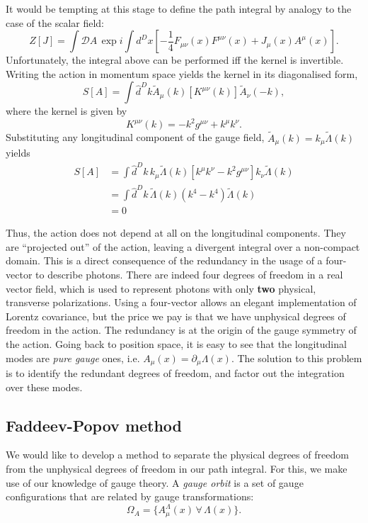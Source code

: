 \documentclass{article}
\numberwithin{equation}{section}
\begin{document}
It would be tempting at this stage to define the path integral by analogy to the case of the scalar field:
\begin{equation}
    Z[J] = \int \mathcal{D}A \, \exp{i \int d^Dx \left[-\frac{1}{4}F_{\mu\nu}(x)F^{\mu\nu}(x) + J_\mu(x) A^\mu(x)\right]}.
\end{equation}
Unfortunately, the integral above can be performed iff the kernel is invertible. Writing the action in momentum space yields the kernel in its diagonalised form,
\begin{equation}
    S[A] = \int \hat{d}^Dk \tilde{A}_\mu(k)[K^{\mu\nu}(k)]\tilde{A}_\nu(-k),
\end{equation}
where the kernel is given by 
\begin{equation}
    K^{\mu\nu}(k) = -k^2 g^{\mu\nu} + k^\mu k^\nu.
\end{equation}
Substituting any longitudinal component of the gauge field, $\tilde{A}_\mu(k) = k_\mu \tilde{\Lambda}(k)$ yields
\begin{equation}
\begin{aligned}
    S[A] &= \int \hat{d}^Dk \,k_\mu \tilde{\Lambda}(k)[k^\mu k^\nu - k^2 g^{\mu\nu}]k_\nu \tilde{\Lambda}(k) \\
    &= \int \hat{d}^Dk \, \tilde{\Lambda}(k) (k^4 - k^4)\tilde{\Lambda}(k) \\
    &= 0
\end{aligned}
\end{equation}

Thus, the action does not depend at all on the longitudinal components. They are ``projected out'' of the action, leaving a divergent integral over a non-compact domain. This is a direct consequence of the redundancy in the usage of a four-vector to describe photons. There are indeed four degrees of freedom in a real vector field, which is used to represent photons with only \textbf{two} physical, transverse polarizations. Using a four-vector allows an elegant implementation of Lorentz covariance, but the price we pay is that we have unphysical degrees of freedom in the action. The redundancy is at the origin of the gauge symmetry of the action. Going back to position space, it is easy to see that the longitudinal modes are \textit{pure gauge} ones, i.e. $A_\mu(x) = \partial_\mu \Lambda(x)$. The solution to this problem is to identify the redundant degrees of freedom, and factor out the integration over these modes.

\subsection{Faddeev-Popov method}
We would like to develop a method to separate the physical degrees of freedom from the unphysical degrees of freedom in our path integral. For this, we make use of our knowledge of gauge theory. 
A \textit{gauge orbit} is a set of gauge configurations that are related by gauge transformations:
\begin{equation}
    \Omega_A = \{A_\mu^\Lambda(x) \,\forall \,\Lambda(x)\}.
\end{equation}
\end{document}
